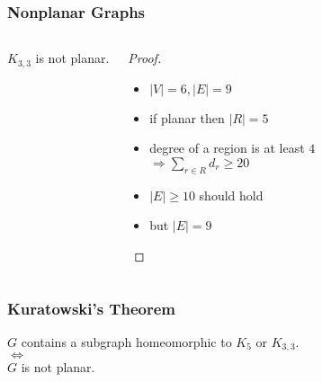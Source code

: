 \documentclass[dvipsnames]{beamer}
\begin{document}
\begin{frame}
  \frametitle{Nonplanar Graphs}

  \begin{columns}
    \begin{theorem}
      $K_{3,3}$ is not planar.

      \medskip
      \begin{center}
      \end{center}
    \end{theorem}

    \pause
    \begin{proof}
      \begin{itemize}
        \item $|V| = 6, |E| = 9$

        \pause
        \item if planar then $|R| = 5$

        \pause
        \item degree of a region is at least $4$\\
          $\Rightarrow \sum_{r \in R} d_r \geq 20$

        \pause
        \item $|E| \geq 10$ should hold

        \pause
        \item but $|E| = 9$
      \end{itemize}
    \end{proof}
  \end{columns}
\end{frame}

\begin{frame}
  \frametitle{Kuratowski's Theorem}

  \begin{theorem}
    \begin{center}
      $G$ contains a subgraph homeomorphic to $K_5$ or $K_{3,3}$.\\
      $\Leftrightarrow$\\
      $G$ is not planar.
    \end{center}
  \end{theorem}
\end{frame}
\end{document}
